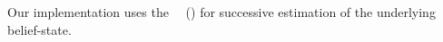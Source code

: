 

Our implementation uses the
~\citeauthor{king:2009}~(\citeyear{king:2009})  for
successive estimation of the underlying belief-state.
